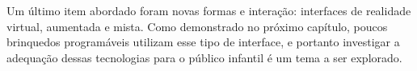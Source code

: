 Um último item abordado foram novas formas e interação: interfaces de realidade virtual, aumentada e mista. Como demonstrado no próximo capítulo, poucos brinquedos programáveis utilizam esse tipo de interface, e portanto investigar a adequação dessas tecnologias para o público infantil é um tema a ser explorado.



